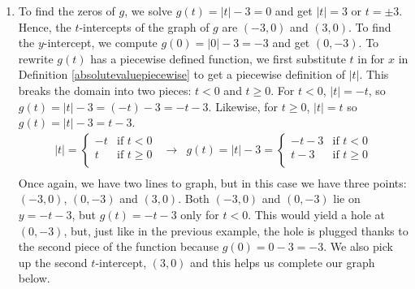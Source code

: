 \documentclass{ximera}
\begin{document}
\begin{example}
\begin{enumerate}
\begin{image}
\end{image}
   
   
Now that we have a complete graph,\footnote{We know it's complete because we did the Math - no trusting technology on this example!}  we see that the vertex is $(3, 0)$ and the range  is $[0, \infty)$.  The minimum of $f$ is $0$ when $x = 3$ and $f$ has no maximum.  Also, $f$  is decreasing over $(-\infty, 3]$ and increasing on $[3, \infty)$. 

   

\item To find the zeros of $g$, we solve $g(t) = |t| - 3 = 0$ and get $|t| = 3$ or $t = \pm 3$.  Hence, the $t$-intercepts of the graph of $g$ are $(-3, 0)$ and $(3, 0)$.  To find the $y$-intercept, we compute $g(0) = |0| - 3 = -3$ and get $(0, -3)$.   To rewrite $g(t)$ has a piecewise defined function, we first substitute $t$ in for $x$ in Definition \ref{absolutevaluepiecewise} to get a piecewise definition of $|t|$.  This breaks the domain into two pieces: $t < 0$ and $t \geq 0$.  For $t<0$, $|t| = -t$, so $g(t) = |t| - 3 = (-t) - 3 = -t - 3$.  Likewise, for $t \geq 0$, $|t| = t$ so $g(t) = |t| - 3 = t - 3$. \[ \begin{array}{ccc}

 |t|  = \begin{cases} 
     -t & \text{if $t  < 0$} \\
     t  & \text{if $t \geq 0$} \\
   \end{cases}
   
 &
 
 \longrightarrow
 
 &
 
 g(t) = |t| - 3 =   \begin{cases} 
     -t  - 3&  \text{if $t  < 0$} \\
     t  - 3 & \text{if $t \geq 0$} \\
   \end{cases} \\ 
   
   \end{array}  \] Once again, we have two lines to graph, but in this case we have three points:  $(-3, 0)$, $(0, -3)$ and $(3, 0)$.  Both $(-3, 0)$ and $(0, -3)$ lie on $y = -t - 3$, but $g(t) = -t - 3$ only for $t < 0$.  This would yield a hole at $(0, -3)$, but, just like in the previous example,  the hole is plugged  thanks to the second piece of the function because $g(0) = 0 - 3 = -3$.  We also pick up the second $t$-intercept, $(3, 0)$ and this helps us complete our graph below.   


\end{enumerate}
\end{example}
\end{document}
